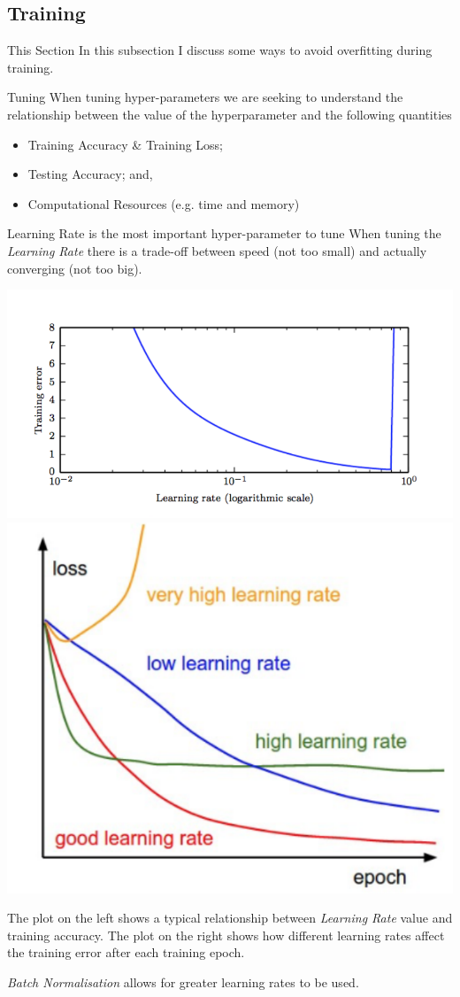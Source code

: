 \documentclass[11pt,a4paper]{article}
\begin{document}
\subsection{Training}

\begin{remark}{This Section}
  In this subsection I discuss some ways to avoid overfitting during training.
\end{remark}

\begin{remark}{Tuning}
  When tuning hyper-parameters we are seeking to understand the relationship between the value of the hyperparameter and the following quantities
  \begin{itemize}
    \item Training Accuracy \& Training Loss;
    \item Testing Accuracy; and,
    \item Computational Resources (e.g. time and memory)
  \end{itemize}
\end{remark}

\begin{remark}{Learning Rate is the most important hyper-parameter to tune}
  When tuning the \textit{Learning Rate} there is a trade-off between speed (not too small) and actually converging (not too big).
  \begin{center}
    \includegraphics[width=.35\textwidth]{LearningRate.PNG}
    \includegraphics[width=.35\textwidth]{DifferentLearningRates.PNG}
  \end{center}
  The plot on the left shows a typical relationship between \textit{Learning Rate} value and training accuracy. The plot on the right shows how different learning rates affect the training error after each training epoch.
  \par \textit{Batch Normalisation} allows for greater learning rates to be used.
\end{remark}
\end{document}
